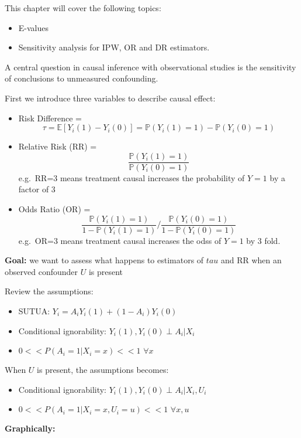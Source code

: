\documentclass[
]{book}
\providecommand{\tightlist}{%
  \setlength{\itemsep}{0pt}\setlength{\parskip}{0pt}}
\begin{document}
This chapter will cover the following topics:

\begin{itemize}
\tightlist
\item
  E-values
\item
  Sensitivity analysis for IPW, OR and DR estimators.
\end{itemize}

A central question in causal inference with observational studies is the sensitivity of conclusions to unmeasured confounding.

First we introduce three variables to describe causal effect:

\begin{itemize}
\tightlist
\item
  Risk Difference = \[\tau = \mathbb{E}[Y_i(1) - Y_i(0)] = \mathbb{P}(Y_i(1)=1)-\mathbb{P}(Y_i(0)=1)\]
\item
  Relative Risk (RR) = \[\frac{\mathbb{P}(Y_i(1)=1)}{\mathbb{P}(Y_i(0)=1)}\] e.g.~RR=3 means treatment causal increases the probability of \(Y=1\) by a factor of 3
\item
  Odds Ratio (OR) = \[\frac{\mathbb{P}(Y_i(1)=1)}{1-\mathbb{P}(Y_i(1)=1)}\bigg/\frac{\mathbb{P}(Y_i(0)=1)}{1-\mathbb{P}(Y_i(0)=1)}\] e.g.~OR=3 means treatment causal increases the odss of \(Y=1\) by 3 fold.
\end{itemize}

\textbf{Goal:} we want to assess what happens to estimators of \(tau\) and RR when an observed confounder \(U\) is present

Review the assumptions:

\begin{itemize}
\tightlist
\item
  SUTUA: \(Y_i = A_iY_i(1) + (1-A_i)Y_i(0)\)
\item
  Conditional ignorability: \(Y_i(1),Y_i(0) \perp A_i |X_i\)
\item
  \(0 << P(A_i=1|X_i=x) <<1 \,\,\forall x\)
\end{itemize}

When \(U\) is present, the assumptions becomes:

\begin{itemize}
\tightlist
\item
  Conditional ignorability: \(Y_i(1),Y_i(0) \perp A_i |X_i, U_i\)
\item
  \(0 << P(A_i=1|X_i=x, U_i=u) <<1 \,\,\forall x,u\)
\end{itemize}

\textbf{Graphically:}
\end{document}
